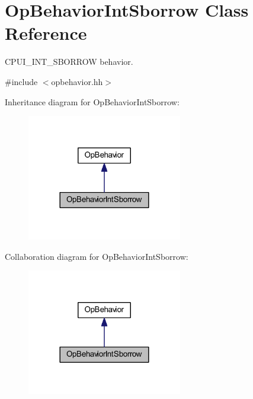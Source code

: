 \hypertarget{class_op_behavior_int_sborrow}{}\section{Op\+Behavior\+Int\+Sborrow Class Reference}
\label{class_op_behavior_int_sborrow}


C\+P\+U\+I\+\_\+\+I\+N\+T\+\_\+\+S\+B\+O\+R\+R\+OW behavior.  




{\ttfamily \#include $<$opbehavior.\+hh$>$}



Inheritance diagram for Op\+Behavior\+Int\+Sborrow\+:
\nopagebreak
\begin{figure}[H]
\begin{center}
\leavevmode
\includegraphics[width=192pt]{class_op_behavior_int_sborrow__inherit__graph}
\end{center}
\end{figure}


Collaboration diagram for Op\+Behavior\+Int\+Sborrow\+:
\nopagebreak
\begin{figure}[H]
\begin{center}
\leavevmode
\includegraphics[width=192pt]{class_op_behavior_int_sborrow__coll__graph}
\end{center}
\end{figure}
